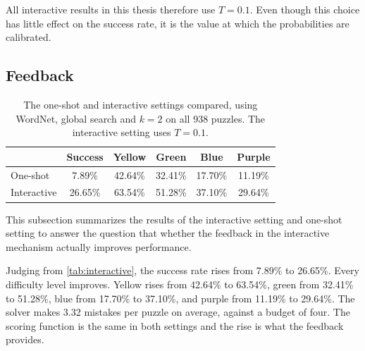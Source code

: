 All interactive results in this thesis therefore use $T = 0.1$. Even though this choice has little effect on the success rate, it is the value at which the probabilities are calibrated.

\subsection{Feedback}
\label{sec:exp-feedback}

\begin{table}[t]
\centering
\caption{The one-shot and interactive settings compared, using WordNet, global search and $k = 2$ on all 938 puzzles. The interactive setting uses $T = 0.1$.}
\label{tab:interactive}
\begin{tabular}{lccccc}
\toprule
& Success & Yellow & Green & Blue & Purple \\
\midrule
One-shot & 7.89\% & 42.64\% & 32.41\% & 17.70\% & 11.19\% \\
Interactive & 26.65\% & 63.54\% & 51.28\% & 37.10\% & 29.64\% \\
\bottomrule
\end{tabular}
\end{table}

This subsection summarizes the results of the interactive setting and one-shot setting to answer the question that whether the feedback in the interactive mechanism actually improves performance.

Judging from \autoref{tab:interactive}, the success rate rises from 7.89\% to 26.65\%. Every difficulty level improves. Yellow rises from 42.64\% to 63.54\%, green from 32.41\% to 51.28\%, blue from 17.70\% to 37.10\%, and purple from 11.19\% to 29.64\%. The solver makes 3.32 mistakes per puzzle on average, against a budget of four. The scoring function is the same in both settings and the rise is what the feedback provides.
